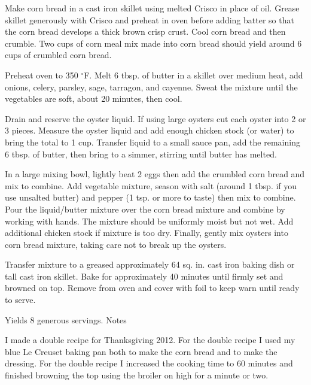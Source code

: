 \documentclass[letterpaper]{recipePMG}
\renewcommand{\deg}{$^\circ$}
\begin{document}

Make corn bread in a cast iron skillet using melted Crisco in place of oil.
Grease skillet generously with Crisco and preheat in oven before adding 
batter so that the corn bread develops a thick brown crisp crust. 
Cool corn bread and then crumble. Two cups of corn meal mix made into
corn bread should yield around 6 cups of crumbled corn bread.

Preheat oven to 350 \deg F.  Melt 6 tbsp. of butter in a skillet over medium heat, 
add onions, celery, parsley, sage, tarragon, and cayenne.  Sweat the mixture 
until the vegetables are soft, about 20 minutes, then cool.

Drain and reserve the oyster liquid.  If using large oysters cut each oyster 
into 2 or 3 pieces.  Measure the oyster liquid and add enough chicken stock 
(or water) to bring the total to 1 cup.  Transfer liquid to a small sauce pan, 
add the remaining 6 tbsp. of butter, then bring to a simmer, stirring until 
butter has melted.

In a large mixing bowl, lightly beat 2 eggs then add the crumbled corn bread
and mix to combine.  Add vegetable mixture, season with salt (around 1 tbsp. 
if you use unsalted butter) and pepper (1 tsp. or more to taste) 
then mix to combine.  Pour the liquid/butter mixture over the corn bread 
mixture and combine by working with hands.  The mixture should be
uniformly moist but not wet. Add additional chicken stock if mixture is too dry.
Finally, gently mix oysters into corn bread mixture, taking care not 
to break up the oysters.

Transfer mixture to a greased approximately 64 sq. in. cast iron baking dish
or tall cast iron skillet.  Bake for approximately 40 minutes until firmly set 
and browned on top.  Remove from oven and cover with foil to keep 
warn until ready to serve.

Yields 8 generous servings.
Notes

I made a double recipe for Thanksgiving 2012.  
For the double recipe I used my blue Le Creuset baking pan both to make the 
corn bread and to make the dressing.  For the double recipe I increased the 
cooking time to 60 minutes and finished browning the top using the broiler 
on high for a minute or two.
\end{document}
